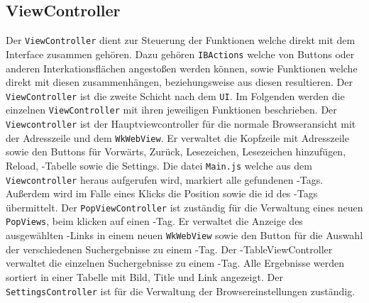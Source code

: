 \subsection{ViewController}
Der \lstinline|ViewController| dient zur Steuerung der Funktionen welche direkt mit dem Interface zusammen gehören. Dazu gehören
\lstinline|IBActions| welche von Buttons oder anderen Interkationsflächen angestoßen werden können, sowie Funktionen welche direkt mit diesen zusammenhängen, beziehungsweise aus diesen resultieren. Der \lstinline|ViewController| ist die zweite Schicht nach dem \lstinline|UI|. Im
Folgenden werden die einzelnen \lstinline|ViewController| mit ihren jeweiligen Funktionen beschrieben.
Der \lstinline|Viewcontroller| ist der Hauptviewcontroller für die normale Browseransicht mit der Adresszeile und dem \lstinline|WkWebView|. Er verwaltet die Kopfzeile mit Adresszeile sowie den Buttons für Vorwärts, Zurück, Lesezeichen, Lesezeichen hinzufügen, Reload, \SECH-Tabelle sowie die Settings. Die datei \lstinline|Main.js| welche aus dem \lstinline|Viewcontroller| heraus aufgerufen wird, markiert alle gefundenen \SEARCH-Tags. Außerdem wird im Falle eines Klicks die Position sowie die id des \SEARCH-Tags übermittelt.
Der \lstinline|PopViewController| ist zuständig für die Verwaltung eines neuen \lstinline|PopViews|, beim klicken auf einen \SEARCH-Tag. Er verwaltet die Anzeige des ausgewählten \SEARCH-Links in einem neuen \lstinline|WkWebView| sowie den Button für die Auswahl der verschiedenen Suchergebnisse zu einem \SEARCH-Tag.
Der \SEARCH-TableViewController verwaltet die einzelnen Suchergebnisse zu einem \SEARCH-Tag. Alle Ergebnisse werden sortiert in einer Tabelle mit Bild, Title und Link angezeigt.
Der \lstinline|SettingsController| ist für die Verwaltung der Browsereinstellungen zuständig.


